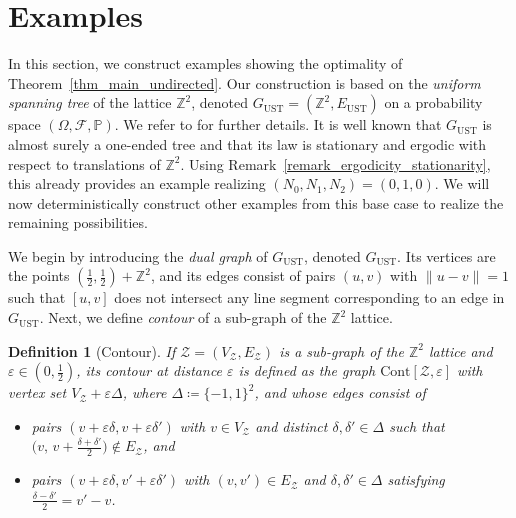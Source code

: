 \documentclass[a4paper, 11pt]{article} %
\theoremstyle{plain}
\newtheorem{definition}[theorem]{Definition}
\newcommand{\Z}{\mathbb{Z}}
\newcommand{\1}{\mathds 1}
\renewcommand{\P}{\mathbb{P}}
\numberwithin{equation}{section}
\begin{document}
\section{Examples}

\label{section_examples}




In this section, we construct examples showing the optimality of Theorem~\ref{thm_main_undirected}. Our construction is based on the \emph{uniform spanning tree} of the lattice $\Z^2$, denoted $G_\mathrm{UST}=(\Z^2, E_\mathrm{UST})$ on a probability space $(\Omega,\mathcal F,\P)$. We refer to \cite{uniform_spanning_forest} for further details. It is well known that $G_\mathrm{UST}$ is almost surely a one-ended tree and that its law is stationary and ergodic with respect to translations of $\Z^2$. Using Remark~\ref{remark_ergodicity_stationarity}, this already provides an example realizing $(N_0, N_1, N_2)=(0,1,0)$. We will now deterministically construct other examples from this base case to realize the remaining possibilities.

We begin by introducing the \emph{dual graph} of $G_\mathrm{UST}$, denoted $G_\mathrm{UST}$. Its vertices are the points $(\frac12,\frac12)+\Z^2$, and its edges consist of pairs $(u, v)$ with $\|u-v\|=1$ such that $[u, v]$ does not intersect any line segment corresponding to an edge in $G_\mathrm{UST}$. Next, we define \emph{contour} of a sub-graph of the $\Z^2$ lattice.


\begin{definition}[Contour]
    If $\mathcal Z=(V_\mathcal Z,E_\mathcal Z)$ is a sub-graph of the $\Z^2$ lattice and
    $\varepsilon\in(0,\tfrac12)$, its contour at distance $\varepsilon$ is defined as the graph
    $\mathrm{Cont}[\mathcal Z,\varepsilon]$ with vertex set
    $V_\mathcal Z+\varepsilon\Delta$, where $\Delta\coloneqq\{-1,1\}^2$, and whose edges consist of 
        \begin{itemize}
            \item pairs $(v+\varepsilon\delta,v+\varepsilon\delta')$ with $v\in V_\mathcal Z$
            and distinct $\delta,\delta'\in\Delta$ such that
            $\bigl(v,\,v+\tfrac{\delta+\delta'}2\bigr)\notin E_\mathcal Z$,
            and
            \item pairs $(v+\varepsilon\delta,v'+\varepsilon\delta')$ with $(v,v')\in E_\mathcal Z$
            and $\delta,\delta'\in\Delta$ satisfying
            $\tfrac{\delta-\delta'}2=v'-v$.
        \end{itemize}
\end{definition}
\end{document}
